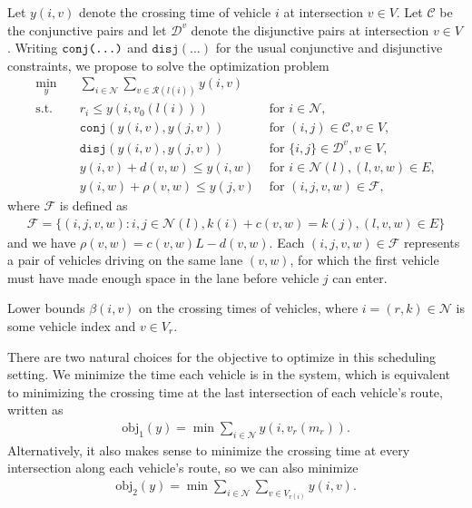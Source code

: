 \documentclass[a4paper]{article}
\theoremstyle{definition}
\theoremstyle{plain}
\begin{document}
Let $y(i,v)$ denote the crossing time of vehicle $i$ at intersection $v \in V$.
Let $\mathcal{C}$ be the conjunctive pairs and let $\mathcal{D}^{v}$ denote the
disjunctive pairs at intersection $v \in V$.
%
Writing $\texttt{conj(\dots)}$ and $\texttt{disj}(\dots)$ for the usual
conjunctive and disjunctive constraints, we propose to solve the optimization
problem
\begin{subequations}\label{eq:network_problem}
\begin{align}
  \min_{y} \quad & \sum_{i \in \mathcal{N}} \sum_{v \in \mathcal{R}(l(i))} y(i,v) & \\
  \text{s.t.} \quad & r_{i} \leq y(i, v_{0}(l(i))) & \text{ for } i \in \mathcal{N} , \\
  & \texttt{conj}(y(i,v), y(j,v)) & \text{ for } (i,j) \in \mathcal{C}, v \in V , \\
  & \texttt{disj}(y(i,v), y(j,v)) & \text{ for } \{i,j\} \in \mathcal{D}^{v}, v \in V , \\
  & y(i, v) + d(v, w) \leq y(i, w) & \text{ for } i \in \mathcal{N}(l), (l, v, w) \in E, \label{eq:travel_delay} \\
  & y(i, w) + \rho(v, w) \leq y(j, v) & \text{ for } (i,j,v,w) \in \mathcal{F} , \label{eq:buffer_constraints}
\end{align}
\end{subequations}
where $\mathcal{F}$ is defined as
\begin{align*}
  \mathcal{F} = \{ (i,j,v,w) : i,j \in \mathcal{N}(l), k(i) + c(v,w) = k(j),  (l,v,w) \in E\}
\end{align*}
and we have $\rho(v, w) = c(v, w) L - d(v, w)$. Each $(i,j,v,w) \in \mathcal{F}$
represents a pair of vehicles driving on the same lane $(v,w)$, for which the
first vehicle must have made enough space in the lane before vehicle $j$ can
enter.


Lower bounds $\beta(i, v)$ on the crossing times of vehicles, where
$i = (r, k) \in \mathcal{N}$ is some vehicle index and $v \in V_{r}$.

There are two natural choices for the objective to optimize in this scheduling
setting.
%
We minimize the time each vehicle is in the system, which is equivalent to
minimizing the crossing time at the last intersection of each vehicle's route, written as
\begin{align*}
  \text{obj}_{1}(y) = \min \sum_{i \in \mathcal{N}} y(i, v_{r}(m_{r})) .
\end{align*}
Alternatively, it also makes sense to minimize the crossing time at every
intersection along each vehicle's route, so we can also minimize
\begin{align*}
  \text{obj}_{2}(y) = \min \sum_{i \in \mathcal{N}} \sum_{v \in V_{r(i)}} y(i, v) .
\end{align*}
\end{document}

